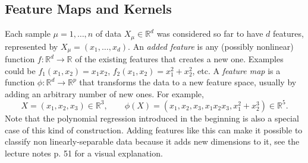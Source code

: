 \documentclass{article}
\begin{document}
\subsection{Feature Maps and Kernels}
Each sample $\mu = 1,\dots,n$ of data $X_{\mu} \in \mathbb{R}^d$ was considered so far to have $d$ features, represented by $X_{\mu} = (x_1,\dots,x_d)$. An \emph{added feature} is any (possibly nonlinear) function $f: \mathbb{R}^d \rightarrow \mathbb{R}$ of the existing features that creates a new one. Examples could be $f_1(x_1,x_2) = x_1x_2$, $f_2(x_1,x_2) = x_1^2 + x_2^2$, etc. A \emph{feature map} is a function $\phi: \mathbb{R}^d \rightarrow \mathbb{R}^p$ that transforms the data to a new feature space, usually by adding an arbitrary number of new ones. For example,
\begin{equation}
    X = (x_1,x_2,x_3) \in \mathbb{R}^3, \quad\quad
    \phi(X) = (x_1,x_2,x_3,x_1x_2x_3,x_1^2 + x_2^3)
    \in \mathbb{R}^5.
\end{equation}
Note that the polynomial regression introduced in the beginning is also a special case of this kind of construction. Adding features like this can make it possible to classify non linearly-separable data because it adds new dimensions to it, see the lecture notes p. 51 for a visual explanation.
\end{document}
